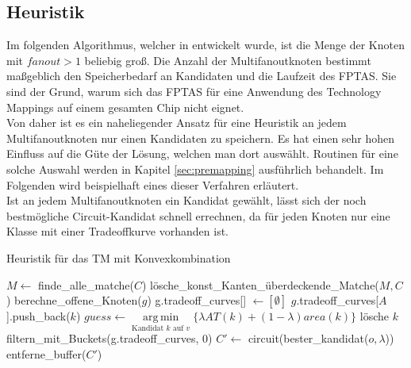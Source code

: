 \documentclass[11pt, a4paper, german]{article}
\DeclareMathOperator*{\argmin}{arg\,min}
\begin{document}
\subsection{Heuristik}
\label{subsec:heuristik}
Im folgenden Algorithmus, welcher in \cite{Elbert} entwickelt wurde,  ist die Menge der Knoten mit $fanout > 1$ beliebig groß.
Die Anzahl der Multifanoutknoten bestimmt maßgeblich den Speicherbedarf an Kandidaten und die Laufzeit des FPTAS. Sie sind der Grund, warum sich das FPTAS für eine Anwendung des Technology Mappings auf einem gesamten Chip nicht eignet. \\
Von daher ist es ein naheliegender Ansatz für eine Heuristik an jedem Multifanoutknoten nur einen Kandidaten zu speichern. Es hat einen sehr hohen Einfluss auf die Güte der Lösung, welchen man dort auswählt. Routinen für eine solche Auswahl werden in Kapitel \ref{sec:premapping} ausführlich behandelt. Im Folgenden wird beispielhaft eines dieser Verfahren erläutert. \\
Ist an jedem Multifanoutknoten ein Kandidat gewählt, lässt sich der noch bestmögliche Circuit-Kandidat schnell errechnen, da für jeden Knoten nur eine Klasse mit einer Tradeoffkurve vorhanden ist.\\
\newpage
\LinesNumbered
\begin{algorithm}[H]
\DontPrintSemicolon
\caption{Heuristik f\"ur das TM mit Konvexkombination}

   $M \gets$ finde\_alle\_matche($C$)\;
   lösche\_konst\_Kanten\_überdeckende\_Matche($M, C$)\;
        {
			berechne\_offene\_Knoten($g$)\;	 
        }
  {
    g.tradeoff\_curves[] $\gets [\emptyset]$\;
    {
      {
        {
        	 {
			$g$.tradeoff\_curves[$A$].push\_back($k$)\;      	 
        	 }  
        }
      }
    }
  {
    $guess \gets \argmin\limits_{\text{Kandidat }k\text{ auf }v}\{ \lambda AT(k) + (1-\lambda) area(k)  \}$\;
    {
      {
	l\"osche $k$\;
      }
    }
  }    
    filtern\_mit\_Buckets(g.tradeoff\_curves, 0)\;    
  }
  $C' \gets $ circuit(bester\_kandidat($o, \lambda$))\;
  \Return entferne\_buffer($C'$)\;
\end{algorithm}\ \\
\end{document}
